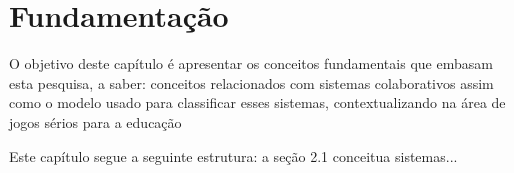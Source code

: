 \chapter{Fundamentação}\label{ch:Fundamentacao}

O objetivo deste capítulo é apresentar os conceitos fundamentais que embasam esta pesquisa, a saber: conceitos relacionados com sistemas colaborativos assim como o modelo usado para classificar esses sistemas, contextualizando na área de jogos sérios para a educação


Este capítulo segue a seguinte estrutura: a seção 2.1 conceitua sistemas...